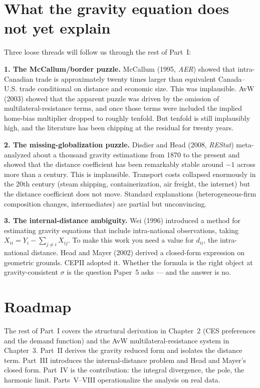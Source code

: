 \documentclass[11pt,letterpaper,oneside]{book}
\theoremstyle{definition}
\theoremstyle{remark}
\begin{document}
\section{What the gravity equation does not yet explain}

Three loose threads will follow us through the rest of Part~I:

\textbf{1. The McCallum/border puzzle.} McCallum (1995, \emph{AER}) showed that intra-Canadian trade is approximately twenty times larger than equivalent Canada--U.S. trade conditional on distance and economic size. This was implausible. AvW (2003) showed that the apparent puzzle was driven by the omission of multilateral-resistance terms, and once those terms were included the implied home-bias multiplier dropped to roughly tenfold. But tenfold is still implausibly high, and the literature has been chipping at the residual for twenty years.

\textbf{2. The missing-globalization puzzle.} Disdier and Head (2008, \emph{REStat}) meta-analyzed about a thousand gravity estimations from 1870 to the present and showed that the distance coefficient has been remarkably stable around $-1$ across more than a century. This is implausible. Transport costs collapsed enormously in the 20th century (steam shipping, containerization, air freight, the internet) but the distance coefficient does not move. Standard explanations (heterogeneous-firm composition changes, intermediates) are partial but unconvincing.

\textbf{3. The internal-distance ambiguity.} Wei (1996) introduced a method for estimating gravity equations that include intra-national observations, taking $X_{ii} = Y_i - \sum_{j \neq i} X_{ij}$. To make this work you need a value for $d_{ii}$, the intra-national distance. Head and Mayer (2002) derived a closed-form expression on geometric grounds. CEPII adopted it. Whether the formula is the right object at gravity-consistent $\sigma$ is the question Paper~5 asks --- and the answer is no.

\section{Roadmap}

The rest of Part~I covers the structural derivation in Chapter~2 (CES preferences and the demand function) and the AvW multilateral-resistance system in Chapter~3. Part~II derives the gravity reduced form and isolates the distance term. Part~III introduces the internal-distance problem and Head and Mayer's closed form. Part~IV is the contribution: the integral divergence, the pole, the harmonic limit. Parts~V--VIII operationalize the analysis on real data.
\end{document}
